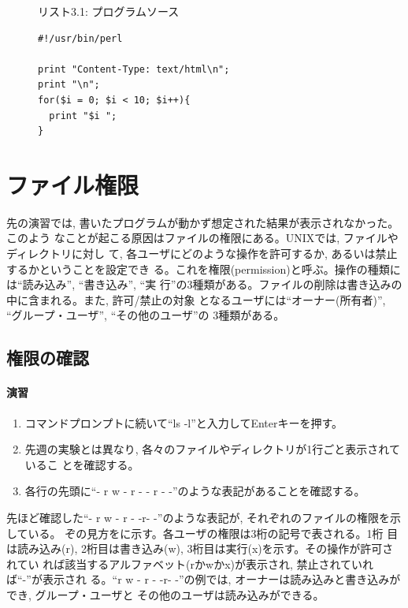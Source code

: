 \begin{figure}[htbp]
\begin{center}
{\small リスト3.1: プログラムソース}
{\small
\begin{verbatim}
#!/usr/bin/perl

print "Content-Type: text/html\n";
print "\n";
for($i = 0; $i < 10; $i++){
  print "$i ";
}
\end{verbatim}
}
\end{center}
\end{figure}

\section{ファイル権限}

先の演習では, 書いたプログラムが動かず想定された結果が表示されなかった。このよう
なことが起こる原因はファイルの権限にある。UNIXでは, ファイルやディレクトリに対し
て, 各ユーザにどのような操作を許可するか, あるいは禁止するかということを設定でき
る。これを権限(permission)と呼ぶ。操作の種類には``読み込み'', ``書き込み'', ``実
行''の3種類がある。ファイルの削除は書き込みの中に含まれる。また, 許可/禁止の対象
となるユーザには``オーナー(所有者)'', ``グループ・ユーザ'', ``その他のユーザ''の
3種類がある。

\subsection{権限の確認}
\paragraph{演習}
\begin{enumerate}
\item コマンドプロンプトに続いて``ls  -l''と入力してEnterキーを押す。
\item 先週の実験とは異なり, 各々のファイルやディレクトリが1行ごと表示されているこ
      とを確認する。
\item 各行の先頭に``- r w - r - - r - -''のような表記があることを確認する。
\end{enumerate}

先ほど確認した``- r w - r - -r- -''のような表記が, それぞれのファイルの権限を示している。
ぞの見方をに示す。各ユーザの権限は3桁の記号で表される。1桁
目は読み込み(r), 2桁目は書き込み(w),  3桁目は実行(x)を示す。その操作が許可されてい
れば該当するアルファベット(rかwかx)が表示され, 禁止されていれば``-''が表示され
る。``r w - r - -r- -''の例では, オーナーは読み込みと書き込みができ, グループ・ユーザと
その他のユーザは読み込みができる。

